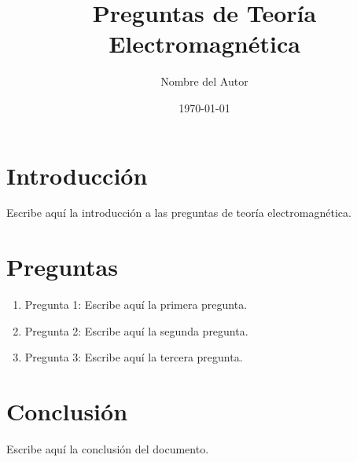 \documentclass[12pt]{article}
\title{Preguntas de Teoría Electromagnética}
\author{Nombre del Autor}
\date{\today}
\begin{document}
\maketitle

\section{Introducción}
Escribe aquí la introducción a las preguntas de teoría electromagnética.

\section{Preguntas}
\begin{enumerate}
    \item Pregunta 1: Escribe aquí la primera pregunta.
    \item Pregunta 2: Escribe aquí la segunda pregunta.
    \item Pregunta 3: Escribe aquí la tercera pregunta.
\end{enumerate}

\section{Conclusión}
Escribe aquí la conclusión del documento.
\end{document}
